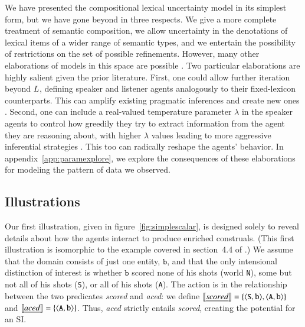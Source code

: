 \documentclass[leqno,12pt]{article}
\newcommand{\figref}[1]{figure~\ref{#1}}
\newcommand{\appendixref}[1]{appendix~\ref{#1}}
\newcommand{\word}[1]{\emph{#1}}
\newcommand{\set}[1]{\ensuremath{\left\{ #1 \right\}}}
\newcommand{\tuple}[1]{\langle #1 \rangle}
\newcommand{\sem}[1]{\ensuremath{\llbracket#1\rrbracket}}
\newcommand{\UncertaintyListener}[1][]{L_{#1}}
\newcommand{\world}[1]{\texttt{#1}}
\newcommand{\playerb}{\texttt{b}}
\begin{document}
{We have presented the compositional lexical uncertainty model in its
simplest form, but we have gone beyond
\citeauthor{Bergen:Levy:Goodman:2014} in three respects. We give a
more complete treatment of semantic composition, we allow uncertainty
in the denotations of lexical items of a wider range of semantic
types, and we entertain the possibility of restrictions on the set of
possible refinements.  However, many other elaborations of models in
this space are possible \citep{Goodman:Lassiter:2013,
  Smith:Goodman:Frank:2013, Kao-etal:2014,Potts:Levy:2015}.  Two
particular elaborations are highly salient given the prior literature.
First, one could allow further iteration beyond
$\UncertaintyListener$, defining speaker and listener agents
analogously to their fixed-lexicon counterparts. This can amplify
existing pragmatic inferences and create new ones
\citep{Bergen:Levy:Goodman:2014,Vogel-etal:2014,Potts:Levy:2015}.
Second, one can include a real-valued temperature parameter $\lambda$
in the speaker agents to control how greedily they try to extract
information from the agent they are reasoning about, with higher
$\lambda$ values leading to more aggressive inferential strategies
\citep{Sutton:Barto:1998}. This too can radically reshape the agents'
behavior. In \appendixref{app:paramexplore}, we explore the
consequences of these elaborations for modeling the pattern of data we
observed.



\subsection{Illustrations}\label{sec:illustrations}

Our first illustration, given in \figref{fig:simplescalar}, is
designed solely to reveal details about how the agents interact to
produce enriched construals. (This first illustration is isomorphic to
the example covered in section~4.4 of
\citealp{Bergen:Levy:Goodman:2014}.) We assume that the domain
consists of just one entity, $\playerb$, and that the only intensional
distinction of interest is whether $\playerb$ scored none of his shots
(world \world{N}), some but not all of his shots (\world{S}), or all
of his shots (\world{A}). The action is in the relationship between
the two predicates \word{scored} and \word{aced}: we define
$\sem{\word{scored\/}} = \set{\tuple{\world{S}, \playerb},
  \tuple{\world{A}, \playerb}}$
and $\sem{\word{aced\/}} = \set{\tuple{\world{A}, \playerb}}$. Thus,
\word{aced} strictly entails \word{scored}, creating the potential for
an SI.

}
\end{document}
